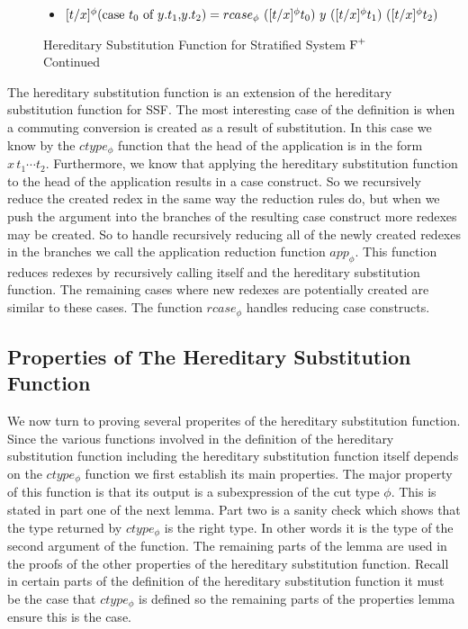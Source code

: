 \begin{figure}
\begin{itemize}
    \item[] $[t/x]^{\phi} (\ccon{t_0}{y}{t_1}{t_2}) = rcase_{\phi}\ ([t/x]^{\phi} t_0)\ y\  ([t/x]^{\phi} t_1)\ ([t/x]^{\phi} t_2)$
  \end{itemize}
  \caption{Hereditary Substitution Function for Stratified System $\mbox{F}^{+}$ Continued}
  \label{fig:hereditary_substitution_function_part2}
\end{figure}
The hereditary substitution function is an extension of the hereditary
substitution function for SSF.  The most interesting case of the
definition is when a commuting conversion is created as a result of
substitution.  In this case we know by the $ctype_\phi$ function that
the head of the application is in the form $x\,t_1 \cdots t_2$.
Furthermore, we know that applying the hereditary substitution
function to the head of the application results in a case construct.
So we recursively reduce the created redex in the same way the
reduction rules do, but when we push the argument into the branches of
the resulting case construct more redexes may be created.  So to
handle recursively reducing all of the newly created redexes in the
branches we call the application reduction function $app_\phi$.  This
function reduces redexes by recursively calling itself and the
hereditary substitution function.  The remaining cases where new
redexes are potentially created are similar to these cases.  The
function $rcase_\phi$ handles reducing case constructs.

\subsection{Properties of The Hereditary Substitution Function}
\label{sec:properties_of_the_hereditary_substitution_function_ssfp}
We now turn to proving several properites of the hereditary
substitution function.  Since the various functions involved in the
definition of the hereditary substitution function including the
hereditary substitution function itself depends on the $ctype_\phi$
function we first establish its main properties.  The major property of
this function is that its output is a subexpression of
the cut type $\phi$.  This is stated in part one of the next lemma.
Part two is a sanity check which shows that the type
returned by $ctype_\phi$ is the right type.  In other words it is the
type of the second argument of the function.  The remaining parts of
the lemma are used in the proofs of the other properties of the
hereditary substitution function.  Recall in certain parts of the
definition of the hereditary substitution function it must be the case
that $ctype_\phi$ is defined so the remaining parts of the properties
lemma ensure this is the case.


